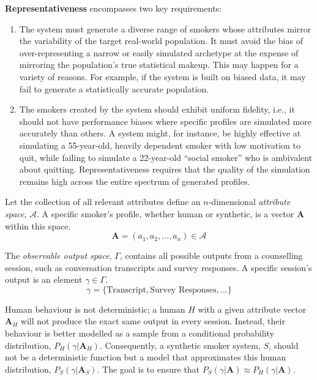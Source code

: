\textbf{Representativeness} encompasses two key requirements:

\begin{enumerate}
	\item The system must generate a diverse range of smokers whose attributes mirror the
	      variability of the target real-world population. It must avoid the bias of
	      over-representing a narrow or easily simulated archetype at the expense of mirroring
	      the population's true statistical makeup. This may happen for a variety of reasons. For
	      example, if the system is built on biased data, it may fail to generate a statistically
	      accurate population.

	\item The smokers created by the system should exhibit uniform fidelity, i.e., it should not
	      have performance biases where specific profiles are simulated more accurately than
	      others. A system might, for instance, be highly effective at simulating a 55-year-old,
	      heavily dependent smoker with low motivation to quit, while failing to simulate a
	      22-year-old ``social smoker'' who is ambivalent about quitting. Representativeness
	      requires that the quality of the simulation remains high across the entire spectrum of
	      generated profiles.
\end{enumerate}

Let the collection of all relevant attributes define an $n$-dimensional \emph{attribute
	space}, $\mathcal{A}$. A specific smoker's profile, whether human or synthetic, is a
vector $\textbf{A}$ within this space.
\[\textbf{A} = (a_1, a_2, \ldots, a_n) \in \mathcal{A}\]

The \emph{observable output space}, $\Gamma$, contains all possible outputs from a
counselling session, such as conversation transcripts and survey responses. A specific
session's output is an element $\gamma \in \Gamma$.
\[\gamma = \{\text{Transcript}, \text{Survey Responses}, \ldots\}\]

Human behaviour is not deterministic; a human $H$ with a given attribute vector
$\textbf{A}_H$ will not produce the exact same output in every session. Instead, their
behaviour is better modelled as a sample from a conditional probability distribution,
$P_H(\gamma | \textbf{A}_H)$. Consequently, a synthetic smoker system, $S$, should not
be a deterministic function but a model that approximates this human distribution,
$P_S(\gamma | \textbf{A}_S)$. The goal is to ensure that $P_S(\gamma | \textbf{A})
	\approx P_H(\gamma | \textbf{A})$.

